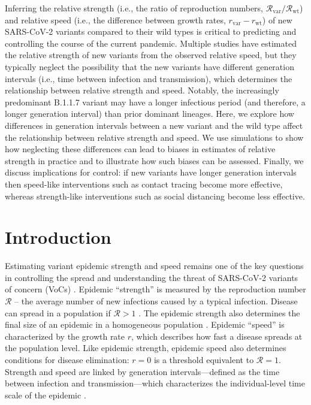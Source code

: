 \documentclass[12pt]{article}
\newcommand{\vvvar}{\mathrm{var}}
\newcommand{\wwwt}{\mathrm{wt}}
\newcommand{\rx}[1]{\ensuremath{{r}_{#1}}\xspace}
\newcommand{\rw}{\rx{\wwwt}}
\newcommand{\rv}{\rx{\vvvar}}
\newcommand{\Rx}[1]{\ensuremath{{\mathcal R}_{#1}}\xspace}
\newcommand{\RR}{\ensuremath{{\mathcal R}}\xspace}
\newcommand{\Rw}{\Rx{\wwwt}}
\newcommand{\Rv}{\Rx{\vvvar}}
\begin{document}
Inferring the relative strength (i.e., the ratio of reproduction numbers, $\Rv/\Rw$) and relative speed (i.e., the difference between growth rates, $\rv-\rw$) of new SARS-CoV-2 variants compared to their wild types is critical to predicting and controlling the course of the current pandemic.
Multiple studies have estimated the relative strength of new variants from the observed relative speed, but they typically neglect the possibility that the new variants have different generation intervals (i.e., time between infection and transmission), which determines the relationship between relative strength and speed.
Notably, the increasingly predominant B.1.1.7 variant may have a longer infectious period (and therefore, a longer generation interval) than prior dominant lineages.
Here, we explore how differences in generation intervals between a new variant and the wild type affect the relationship between relative strength and speed.
We use simulations to show how neglecting these differences can lead to biases in estimates of relative strength in practice and to illustrate how such biases can be assessed.
Finally, we discuss implications for control: if new variants have longer generation intervals then speed-like interventions such as contact tracing become more effective, whereas strength-like interventions such as social distancing become less effective.

\section{Introduction}

Estimating variant epidemic strength and speed remains one of the key questions in controlling the spread and understanding the threat of SARS-CoV-2 variants of concern (VoCs) \citep{switzerland2021variant, davies2021estimated, di2021impact, leung2021early, volz2021transmission,zhao2021}.
Epidemic ``strength'' is measured by the reproduction number $\RR$ -- the average number of new infections caused by a typical infection. 
Disease can spread in a population if $\RR>1$ \citep{diekmann1990definition}.
The epidemic strength also determines the final size of an epidemic in a homogeneous population \citep{anderson1991infectious}.
Epidemic ``speed'' is characterized by the growth rate $r$, which describes how fast a disease spreads at the population level.
Like epidemic strength, epidemic speed also determines conditions for disease elimination: $r=0$ is a threshold equivalent to $\RR=1$.
Strength and speed are linked by generation intervals---defined as the time between infection and transmission---which characterizes the individual-level time scale of the epidemic \citep{roberts2007model,svensson2007note,wallinga2007generation}.
\end{document}
